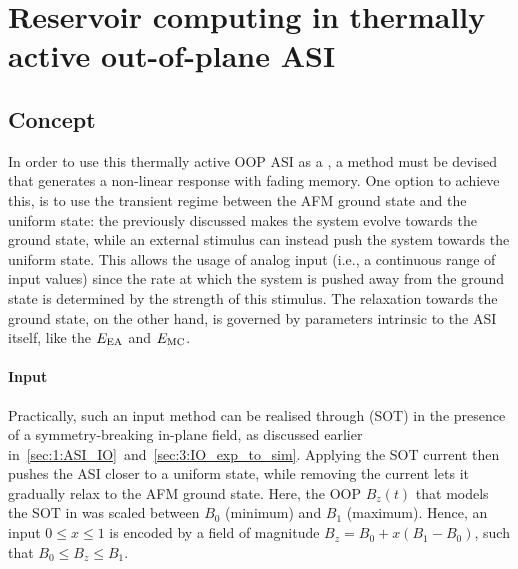 \newpage
\section{Reservoir computing in thermally active out-of-plane ASI}
\subsection{Concept}
In order to use this thermally active OOP ASI as a , a method must be devised that generates a non-linear response with fading memory.
One option to achieve this, is to use the transient regime between the AFM ground state and the uniform state: the previously discussed  makes the system evolve towards the ground state, while an external stimulus can instead push the system towards the uniform state.
This allows the usage of analog input (i.e., a continuous range of input values) since the rate at which the system is pushed away from the ground state is determined by the strength of this stimulus.
The relaxation towards the ground state, on the other hand, is governed by parameters intrinsic to the ASI itself, like the  $E_\mathrm{EA}$ and  $E_\mathrm{MC}$.

\paragraph{Input}
Practically, such an input method can be realised through  (SOT) in the presence of a symmetry-breaking in-plane field, as discussed earlier in~\cref{sec:1:ASI_IO}~and~\ref{sec:3:IO_exp_to_sim}.
Applying the SOT current then pushes the ASI closer to a uniform state, while removing the current lets it gradually relax to the AFM ground state.
Here, the OOP  $B_z(t)$ that models the SOT in \hotspice was scaled between $B_0$ (minimum) and $B_1$ (maximum).
Hence, an input $0 \leq x \leq 1$ is encoded by a field of magnitude $B_z = B_0 + x (B_1 - B_0)$, such that $B_0 \leq B_z \leq B_1$.

